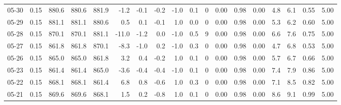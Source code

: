 \begin{threeparttable}
{\begin{tabular}{lrrrrrrrrrrrrrrrrr}
  05-30 &     0.15 & 880.6 & 880.6 & 881.9 &       -1.2 &           -0.1 &                      -0.2 &                     -1.0 &                 0.1 &              0 &       0.00 &      0.98 &           0.00 &              4.8 &                 6.1 &            0.55 &                   5.00 \\
  05-29 &     0.15 & 881.1 & 881.1 & 880.6 &        0.5 &            0.1 &                      -0.1 &                      1.0 &                 0.0 &              0 &       0.00 &      0.98 &           0.00 &              5.3 &                 6.2 &            0.60 &                   5.00 \\
  05-28 &     0.15 & 870.1 & 870.1 & 881.1 &      -11.0 &           -1.2 &                       0.0 &                     -1.0 &                 0.5 &              9 &       0.00 &      0.98 &           0.00 &              6.6 &                 7.6 &            0.75 &                   5.00 \\
  05-27 &     0.15 & 861.8 & 861.8 & 870.1 &       -8.3 &           -1.0 &                       0.2 &                     -1.0 &                 0.3 &              0 &       0.00 &      0.98 &           0.00 &              4.7 &                 6.8 &            0.53 &                   5.00 \\
  05-26 &     0.15 & 865.0 & 865.0 & 861.8 &        3.2 &            0.4 &                      -0.2 &                      1.0 &                 0.1 &              0 &       0.00 &      0.98 &           0.00 &              5.7 &                 6.7 &            0.66 &                   5.00 \\
  05-23 &     0.15 & 861.4 & 861.4 & 865.0 &       -3.6 &           -0.4 &                      -0.4 &                     -1.0 &                 0.1 &              0 &       0.00 &      0.98 &           0.00 &              7.4 &                 7.9 &            0.86 &                   5.00 \\
  05-22 &     0.15 & 868.1 & 868.1 & 861.4 &        6.8 &            0.8 &                      -0.6 &                      1.0 &                 0.3 &              0 &       0.00 &      0.98 &           0.00 &              7.1 &                 8.5 &            0.82 &                   5.00 \\
  05-21 &     0.15 & 869.6 & 869.6 & 868.1 &        1.5 &            0.2 &                      -0.8 &                      1.0 &                 0.1 &              0 &       0.00 &      0.98 &           0.00 &              8.6 &                 9.1 &            0.99 &                   5.00 \\

\end{tabular}}
\end{threeparttable}

